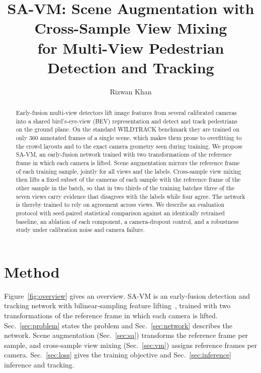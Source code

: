 \documentclass[10pt,twocolumn,letterpaper]{article}
\title{\textbf{SA-VM: Scene Augmentation with Cross-Sample View Mixing\\for Multi-View Pedestrian Detection and Tracking}}
\author{Rizwan Khan}
\date{}
\begin{document}
\maketitle

\begin{abstract}
Early-fusion multi-view detectors lift image features from several calibrated cameras into a shared bird's-eye-view
(BEV) representation and detect and track pedestrians on the ground plane. On the standard WILDTRACK benchmark they
are trained on only 360 annotated frames of a single scene, which makes them prone to overfitting to the crowd layouts
and to the exact camera geometry seen during training. We propose SA-VM, an early-fusion network trained with two transformations of the
reference frame in which each camera is lifted. Scene augmentation
mirrors the reference frame of each training sample, jointly for all views and the labels. Cross-sample view mixing
then lifts a fixed subset of the cameras of each sample with the reference frame of the other sample in the batch,
so that in two thirds of the training batches three of the seven views carry evidence that disagrees with the labels
while four agree. The network is thereby trained to rely on agreement across views. We describe an evaluation protocol with seed-paired statistical comparison against an identically
retrained baseline, an ablation of each component, a camera-dropout control, and a robustness study under
calibration noise and camera failure.
\end{abstract}

\section{Method}
\label{sec:method}

Figure~\ref{fig:overview} gives an overview. SA-VM is an early-fusion detection and tracking network with
bilinear-sampling feature lifting~\cite{teepe2024lifting,harley2023simplebev}, trained with two transformations of
the reference frame in which each camera is lifted. Sec.~\ref{sec:problem} states the problem and
Sec.~\ref{sec:network} describes the network. Scene augmentation (Sec.~\ref{sec:sa}) transforms the reference frame
per sample, and cross-sample view mixing (Sec.~\ref{sec:vm}) assigns reference frames per camera.
Sec.~\ref{sec:loss} gives the training objective and Sec.~\ref{sec:inference} inference and tracking.
\end{document}

